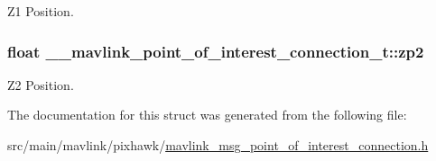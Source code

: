 Z1 Position. 

\hypertarget{struct____mavlink__point__of__interest__connection__t_ae2b19b85b14cc560b2a815dd1c557074}{
\subsubsection[{zp2}]{\setlength{\rightskip}{0pt plus 5cm}float \+\_\+\+\_\+mavlink\+\_\+point\+\_\+of\+\_\+interest\+\_\+connection\+\_\+t\+::zp2}}\label{struct____mavlink__point__of__interest__connection__t_ae2b19b85b14cc560b2a815dd1c557074}


Z2 Position. 



The documentation for this struct was generated from the following file\+:\begin{DoxyCompactItemize}
\item 
src/main/mavlink/pixhawk/\hyperlink{mavlink__msg__point__of__interest__connection_8h}{mavlink\+\_\+msg\+\_\+point\+\_\+of\+\_\+interest\+\_\+connection.\+h}\end{DoxyCompactItemize}
